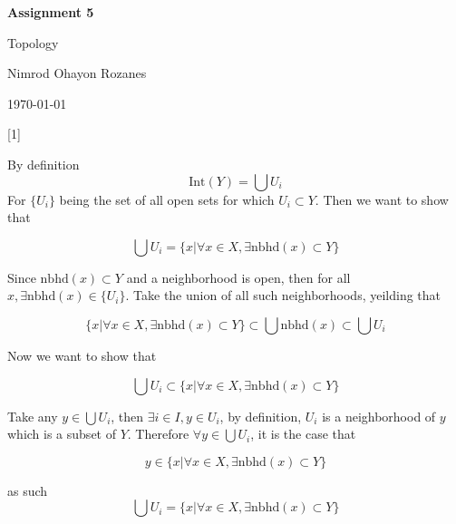 \documentclass{article} %
\newcommand{\question}[2][]{
  \begin{flushleft}
    \textbf{Question #1}: \textit{#2}

\end{flushleft}}
\newcommand{\maketitletwo}[2][]{
  \begin{center}
    \Large{\textbf{Assignment #1}

    Topology} %
    \vspace{5pt}

    \normalsize{Nimrod Ohayon Rozanes  %

    \today}        %
    \vspace{15pt}

\end{center}}
\begin{document}
\maketitletwo[5]  %

\question[1]{}

By definition
$$
\text{Int}(Y) = \bigcup U_i
$$
For $\{U_i\}$ being the set of all open sets for which $U_i \subset
Y$. Then we want to show that

\[
  \bigcup U_i = \{x \vert \forall x \in X, \exists
  \text{nbhd}(x) \subset Y\}
\]

Since $\text{nbhd}(x) \subset Y$ and a neighborhood is open, then for
all $x, \exists \text{nbhd}(x) \in \{U_i\}$. Take the union of all
such neighborhoods, yeilding that

$$
\{x \vert \forall x \in X, \exists
\text{nbhd}(x) \subset Y\} \subset \bigcup \text{nbhd}(x) \subset \bigcup U_i
$$

Now we want to show that

\[
  \bigcup U_i \subset \{x \vert \forall x \in X, \exists
  \text{nbhd}(x) \subset Y\}
\]

Take any $y \in \bigcup U_i$, then $\exists i \in I, y \in U_i$, by
definition, $U_i$ is a neighborhood of $y$ which is a subset of $Y$.
Therefore $\forall y \in \bigcup U_i$, it is the case that

\[
  y  \in \{x \vert \forall x \in X, \exists \text{nbhd}(x) \subset Y\}
\]

as such
\[
  \bigcup U_i = \{x \vert \forall x \in X, \exists \text{nbhd}(x) \subset Y\}
\]
\end{document}

